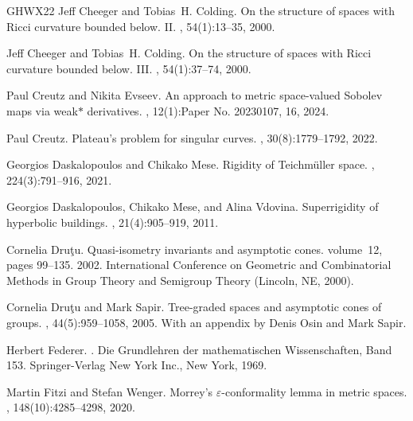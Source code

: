 \documentclass[a4paper,leqno]{amsart}
\numberwithin{equation}{section}
\theoremstyle{remark}
\theoremstyle{remark}
\begin{document}
\begin{thebibliography}{GHWX22}
Jeff Cheeger and Tobias~H. Colding.
\newblock On the structure of spaces with {R}icci curvature bounded below. {II}.
, 54(1):13--35, 2000.

Jeff Cheeger and Tobias~H. Colding.
\newblock On the structure of spaces with {R}icci curvature bounded below. {III}.
, 54(1):37--74, 2000.

Paul Creutz and Nikita Evseev.
\newblock An approach to metric space-valued {S}obolev maps via weak{$*$} derivatives.
, 12(1):Paper No. 20230107, 16, 2024.

Paul Creutz.
\newblock Plateau's problem for singular curves.
, 30(8):1779--1792, 2022.

Georgios Daskalopoulos and Chikako Mese.
\newblock Rigidity of {T}eichm\"uller space.
, 224(3):791--916, 2021.

Georgios Daskalopoulos, Chikako Mese, and Alina Vdovina.
\newblock Superrigidity of hyperbolic buildings.
, 21(4):905--919, 2011.

Cornelia Dru{\c t}u.
\newblock Quasi-isometry invariants and asymptotic cones.
\newblock volume~12, pages 99--135. 2002.
\newblock International Conference on Geometric and Combinatorial Methods in Group Theory and Semigroup Theory (Lincoln, NE, 2000).

Cornelia Dru{\c t}u and Mark Sapir.
\newblock Tree-graded spaces and asymptotic cones of groups.
, 44(5):959--1058, 2005.
\newblock With an appendix by Denis Osin and Mark Sapir.

Herbert Federer.
.
\newblock Die Grundlehren der mathematischen Wissenschaften, Band 153. Springer-Verlag New York Inc., New York, 1969.

Martin Fitzi and Stefan Wenger.
\newblock Morrey's {$\varepsilon$}-conformality lemma in metric spaces.
, 148(10):4285--4298, 2020.


\end{thebibliography}
\end{document}
